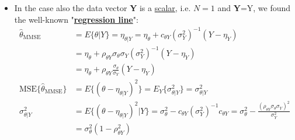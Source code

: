 \begin{itemize}
\begin{align*}
&\hat{\theta}_{\text{MMSE}} = E\{\theta | \mathbf{Y}\} = \eta_{\theta|\mathbf{Y}} = \eta_{\theta} + \mathbf{c}_{\theta\mathbf{Y}}\mathbf{C}_{\mathbf{Y}}^{-1}(\mathbf{Y} - \boldsymbol{\eta}_{\mathbf{Y}}) \\[8pt]
&\text{MSE}\{\hat{\theta}_{\text{MMSE}}\} = E\{(\theta - \eta_{\theta|\mathbf{Y}})^2\} = E_{\mathbf{Y}}\{\sigma_{\theta|\mathbf{Y}}^2\} = \sigma_{\theta|\mathbf{Y}}^2 \\[8pt]
&\sigma_{\theta|\mathbf{Y}}^2 = E\{(\theta - \eta_{\theta|\mathbf{Y}})^2 | \mathbf{Y}\} = \sigma_{\theta}^2 - \mathbf{c}_{\theta\mathbf{Y}}\mathbf{C}_{\mathbf{Y}}^{-1}\mathbf{c}_{\mathbf{Y}\theta} = \sigma_{\theta}^2 - \mathbf{c}_{\theta\mathbf{Y}}^T\mathbf{C}_{\mathbf{Y}}^{-1}\mathbf{c}_{\mathbf{Y}\theta} \\[8pt]
&\mathbf{c}_{\theta\mathbf{Y}} \triangleq E\{(\theta - \eta_{\theta})(\mathbf{Y} - \boldsymbol{\eta}_{\mathbf{Y}})^T\} = E\{(\mathbf{Y} - \boldsymbol{\eta}_{\mathbf{Y}})(\theta - \eta_{\theta})\}^T = (\mathbf{c}_{\mathbf{Y}\theta})^T \\[8pt]
&[\mathbf{c}_{\theta\mathbf{Y}}]_{i} = E\{(\theta - \eta_{\theta})(Y_{i} - \eta_{Y_i})\}, \quad i=0, 1, 2, \dots, N-1
\end{align*}
    \item In the case also the data vector \textbf{Y} is a \underline{scalar}, i.e. \(N=1\) and \textbf{Y}=Y, we found the well-known "\textbf{\underline{regression line}}":
    \begin{align*}
\hat{\theta}_{\text{MMSE}} &= E\{\theta | Y\} = \eta_{\theta|Y} = \eta_{\theta} + c_{\theta Y} (\sigma_{Y}^2)^{-1} (Y - \eta_{Y}) \\[8pt]
&= \eta_{\theta} + \rho_{\theta Y} \sigma_{\theta} \sigma_{Y} (\sigma_{Y}^2)^{-1} (Y - \eta_{Y}) \\[8pt]
&= \eta_{\theta} + \rho_{\theta Y} \frac{\sigma_{\theta}}{\sigma_{Y}} (Y - \eta_{Y}) \\[8pt]
\text{MSE}\{\hat{\theta}_{\text{MMSE}}\} &= E\{(\theta - \eta_{\theta|Y})^2\} = E_{Y} \{\sigma_{\theta|Y}^2\} = \sigma_{\theta|Y}^2 \\[6pt]
\sigma_{\theta|Y}^2 &= E\{(\theta - \eta_{\theta|Y})^2 | Y\} = \sigma_{\theta}^2 - c_{\theta Y} (\sigma_{Y}^2)^{-1} c_{\theta Y} = \sigma_{\theta}^2 - \frac{(\rho_{\theta Y} \sigma_{\theta} \sigma_{Y})^2}{\sigma_{Y}^2} \\[6pt]
&= \sigma_{\theta}^2 (1 - \rho_{\theta Y}^2)
\end{align*}
\end{itemize}
